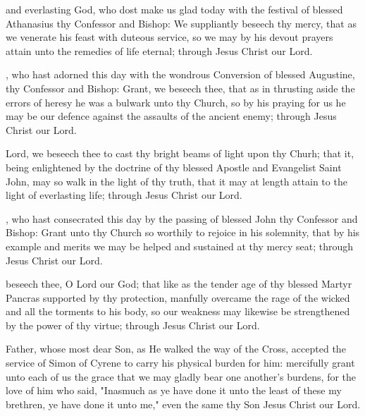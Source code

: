  and everlasting God, who dost make us glad today with the festival of blessed Athanasius thy Confessor and Bishop: We suppliantly beseech thy mercy, that as we venerate his feast with duteous service, so we may by his devout prayers attain unto the remedies of life eternal; through Jesus Christ our Lord.

, who hast adorned this day with the wondrous Conversion of blessed Augustine, thy Confessor and Bishop: Grant, we beseech thee, that as in thrusting aside the errors of heresy he was a bulwark unto thy Church, so by his praying for us he may be our defence against the assaults of the ancient enemy; through Jesus Christ our Lord.

 Lord, we beseech thee to cast thy bright beams of light upon thy Churh; that it, being enlightened by the doctrine of thy blessed Apostle and Evangelist Saint John, may so walk in the light of thy truth, that it may at length attain to the light of everlasting life; through Jesus Christ our Lord.

, who hast consecrated this day by the passing of blessed John thy Confessor and Bishop: Grant unto thy Church so worthily to rejoice in his solemnity, that by his example and merits we may be helped and sustained at thy mercy seat; through Jesus Christ our Lord.

 beseech thee, O Lord our God; that like as the tender age of thy blessed Martyr Pancras supported by thy protection, manfully overcame the rage of the wicked and all the torments to his body, so our weakness may likewise be strengthened by the power of thy virtue; through Jesus Christ our Lord.

 Father, whose most dear Son, as He walked the way of the Cross, accepted the service of Simon of Cyrene to carry his physical burden for him: mercifully grant unto each of us the grace that we may gladly bear one another's burdens, for the love of him who said, "Inasmuch as ye have done it unto the least of these my brethren, ye have done it unto me," even the same thy Son Jesus Christ our Lord.

